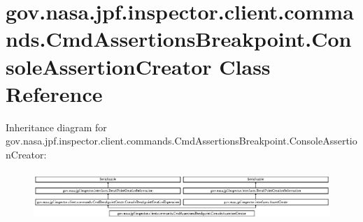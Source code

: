 \hypertarget{classgov_1_1nasa_1_1jpf_1_1inspector_1_1client_1_1commands_1_1_cmd_assertions_breakpoint_1_1_console_assertion_creator}{}\section{gov.\+nasa.\+jpf.\+inspector.\+client.\+commands.\+Cmd\+Assertions\+Breakpoint.\+Console\+Assertion\+Creator Class Reference}
\label{classgov_1_1nasa_1_1jpf_1_1inspector_1_1client_1_1commands_1_1_cmd_assertions_breakpoint_1_1_console_assertion_creator}
Inheritance diagram for gov.\+nasa.\+jpf.\+inspector.\+client.\+commands.\+Cmd\+Assertions\+Breakpoint.\+Console\+Assertion\+Creator\+:\begin{figure}[H]
\begin{center}
\leavevmode
\includegraphics[height=1.898305cm]{classgov_1_1nasa_1_1jpf_1_1inspector_1_1client_1_1commands_1_1_cmd_assertions_breakpoint_1_1_console_assertion_creator}
\end{center}
\end{figure}
